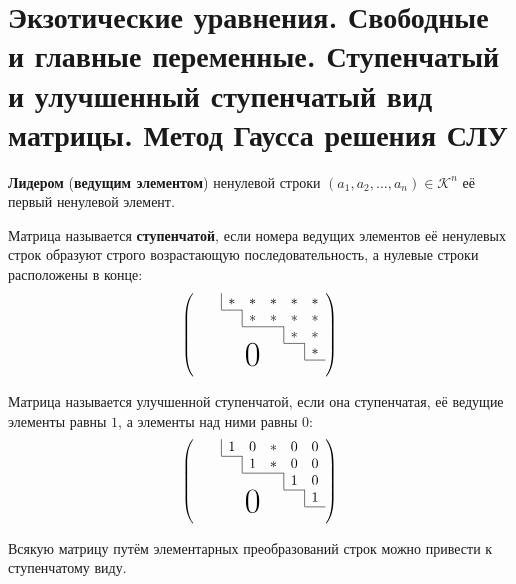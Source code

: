 \section{Экзотические уравнения. Свободные и главные переменные. Ступенчатый и улучшенный ступенчатый вид матрицы. Метод Гаусса решения СЛУ}

\begin{definition}
    \textbf{Лидером} (\textbf{ведущим элементом}) ненулевой строки $(a_1, a_2, \ldots, a_n) \in \mathcal{K}^n$ её первый ненулевой элемент.
\end{definition}

\begin{definition}
    Матрица называется \textbf{ступенчатой}, если номера ведущих элементов её ненулевых строк образуют строго возрастающую последовательность, а нулевые строки расположены в конце:
    $$
    \left(
    \begin{array}{ccccccc}
        {} & \bord & \ast  & \ast     & \ast  & \ast  & \ast \\\cline{3-3}
        {} & {}    & \bord & \ast     & \ast  & \ast  & \ast \\\cline{4-5}
        {} & {}    & {}    & {}       & \bord & \ast  & \ast \\\cline{6-6}
        {} & {}    & {}    & \bigzero & {}    & \bord & \ast \\\cline{7-7}
        {} & {}    & {}    & {}       & {}    & {}    & {}   
    \end{array}
    \right)
    $$

    Матрица называется улучшенной ступенчатой, если она ступенчатая, её ведущие элементы равны $1$, а элементы над ними равны 0:
    $$
    \left(
    \begin{array}{ccccccc}
        {} & \bord & 1     & 0        & \ast  & 0     & 0    \\\cline{3-3}
        {} & {}    & \bord & 1        & \ast  & 0     & 0    \\\cline{4-5}
        {} & {}    & {}    & {}       & \bord & 1     & 0    \\\cline{6-6}
        {} & {}    & {}    & \bigzero & {}    & \bord & 1    \\\cline{7-7}
        {} & {}    & {}    & {}       & {}    & {}    & {}   
    \end{array}
    \right)
    $$
\end{definition}

\begin{theorem}
    Всякую матрицу путём элементарных преобразований строк можно привести к ступенчатому виду.
\end{theorem}

